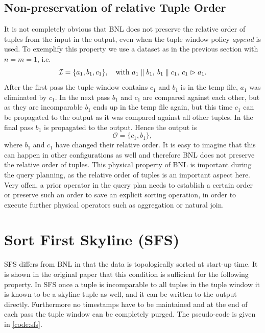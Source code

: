 \subsection{Non-preservation of relative Tuple Order}
\label{sec:bnl-tuple-order}
It is not completely obvious that BNL does not preserve the relative
order of tuples from the input in the output, even when the tuple
window policy \emph{append} is used.  To exemplify this property
we use a dataset as in the previous section with $n=m=1$, i.e.
\[
\mathcal{I} = \{a_1, b_1, c_1\},\quad\text{with}\ a_1 \parallel b_1,\: b_1 \parallel c_1,\: c_1 \vartriangleright a_1.
\]
After the first pass the tuple window contains $c_1$ and $b_1$ is in
the temp file, $a_1$ was eliminated by $c_1$. In the next pass $b_1$
and $c_1$ are compared against each other, but as they are incomparable
$b_1$ ends up in the temp file again, but this time $c_1$ can be
propagated to the output as it was compared against all other tuples.
In the final pass $b_1$ is propagated to the output.  Hence the output
is
\[
\mathcal{O} = \{c_1, b_1\}, 
\]
where $b_1$ and $c_1$ have changed their relative order.  It is easy
to imagine that this can happen in other configurations as well and
therefore BNL does not preserve the relative order of tuples.  This
physical property of BNL is important during the query planning, as the
relative order of tuples is an important aspect here. Very offen, a prior
operator in the query plan needs to establish a certain order or preserve such an order
to save an explicit sorting operation, in order to execute further 
physical operators such as aggregation or natural join.

\section{Sort First Skyline (SFS)}
SFS \citep{Chomicki2003} differs from BNL in that the data is
topologically sorted at start-up time.  It is shown in the original
paper that this condition is sufficient for the following property.  In
SFS once a tuple is incomparable to all tuples in the tuple window it
is known to be a skyline tuple as well, and it can be written to the
output directly.  Furthermore no timestamps have to be maintained and at
the end of each pass the tuple window can be completely purged.
The pseudo-code is given in \autoref{code:sfs}.


